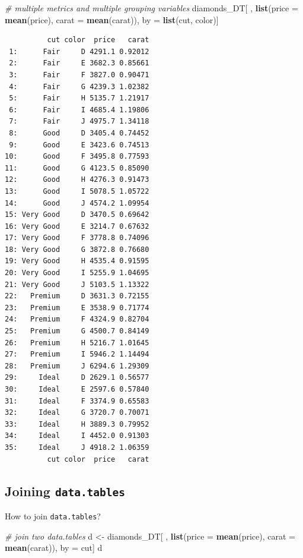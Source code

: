 \documentclass[
]{book}
\newenvironment{Shaded}{\begin{snugshade}}{\end{snugshade}}
\newcommand{\CommentTok}[1]{\textcolor[rgb]{0.56,0.35,0.01}{\textit{#1}}}
\newcommand{\DataTypeTok}[1]{\textcolor[rgb]{0.13,0.29,0.53}{#1}}
\newcommand{\KeywordTok}[1]{\textcolor[rgb]{0.13,0.29,0.53}{\textbf{#1}}}
\newcommand{\NormalTok}[1]{#1}
\newcommand{\StringTok}[1]{\textcolor[rgb]{0.31,0.60,0.02}{#1}}
\begin{document}
\begin{Shaded}
\begin{Highlighting}[]
\CommentTok{# multiple metrics and multiple grouping variables}
\NormalTok{diamonds_DT[ , }\KeywordTok{list}\NormalTok{(}\DataTypeTok{price =} \KeywordTok{mean}\NormalTok{(price), }\DataTypeTok{carat =} \KeywordTok{mean}\NormalTok{(carat)), by =}\StringTok{ }\KeywordTok{list}\NormalTok{(cut, color)]}
\end{Highlighting}
\end{Shaded}

\begin{verbatim}
          cut color  price   carat
 1:      Fair     D 4291.1 0.92012
 2:      Fair     E 3682.3 0.85661
 3:      Fair     F 3827.0 0.90471
 4:      Fair     G 4239.3 1.02382
 5:      Fair     H 5135.7 1.21917
 6:      Fair     I 4685.4 1.19806
 7:      Fair     J 4975.7 1.34118
 8:      Good     D 3405.4 0.74452
 9:      Good     E 3423.6 0.74513
10:      Good     F 3495.8 0.77593
11:      Good     G 4123.5 0.85090
12:      Good     H 4276.3 0.91473
13:      Good     I 5078.5 1.05722
14:      Good     J 4574.2 1.09954
15: Very Good     D 3470.5 0.69642
16: Very Good     E 3214.7 0.67632
17: Very Good     F 3778.8 0.74096
18: Very Good     G 3872.8 0.76680
19: Very Good     H 4535.4 0.91595
20: Very Good     I 5255.9 1.04695
21: Very Good     J 5103.5 1.13322
22:   Premium     D 3631.3 0.72155
23:   Premium     E 3538.9 0.71774
24:   Premium     F 4324.9 0.82704
25:   Premium     G 4500.7 0.84149
26:   Premium     H 5216.7 1.01645
27:   Premium     I 5946.2 1.14494
28:   Premium     J 6294.6 1.29309
29:     Ideal     D 2629.1 0.56577
30:     Ideal     E 2597.6 0.57840
31:     Ideal     F 3374.9 0.65583
32:     Ideal     G 3720.7 0.70071
33:     Ideal     H 3889.3 0.79952
34:     Ideal     I 4452.0 0.91303
35:     Ideal     J 4918.2 1.06359
          cut color  price   carat
\end{verbatim}

\hypertarget{joining-data.tables}{%
\subsection{\texorpdfstring{Joining \texttt{data.tables}}{Joining data.tables}}\label{joining-data.tables}}

How to join \texttt{data.tables}?

\begin{Shaded}
\begin{Highlighting}[]
\CommentTok{# join two data.tables}
\NormalTok{d <-}\StringTok{ }\NormalTok{diamonds_DT[ , }\KeywordTok{list}\NormalTok{(}\DataTypeTok{price =} \KeywordTok{mean}\NormalTok{(price), }\DataTypeTok{carat =} \KeywordTok{mean}\NormalTok{(carat)), by =}\StringTok{ }\NormalTok{cut]}
\NormalTok{d}
\end{Highlighting}
\end{Shaded}
\end{document}
